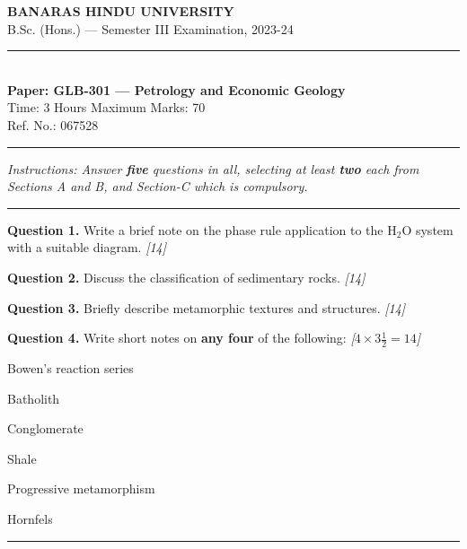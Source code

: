\documentclass[11pt,a4paper]{article}
\newcommand{\pts}[1]{\hfill   \textit{[#1]}}
\begin{document}
\begin{center}
  {\large\bfseries BANARAS HINDU UNIVERSITY}\\[2pt]
  {\normalsize B.Sc. (Hons.) --- Semester III Examination, 2023-24}\\[6pt]
  \rule{0.8\linewidth}{0.5pt}\\[6pt]
  {\large\bfseries Paper: GLB-301 --- Petrology and Economic Geology}\\[4pt]
  {\normalsize Time: 3 Hours \hfill Maximum Marks: 70}\\[2pt]
  {\small Ref. No.: 067528}
\end{center}
\rule{\linewidth}{0.4pt}
\smallskip



\noindent   \textit{Instructions: Answer   \textbf{five} questions in all, selecting at least   \textbf{two} each from Sections A and B, and Section-C which is compulsory.}
\bigskip

\bigskip


\rule{\linewidth}{0.4pt}\smallskip




\noindent   \textbf{Question 1.} Write a brief note on the phase rule application to the $ \text{H}_2 \text{O}$ system with a suitable diagram. \pts{14}

\medskip


\noindent   \textbf{Question 2.} Discuss the classification of sedimentary rocks. \pts{14}

\medskip


\noindent   \textbf{Question 3.} Briefly describe metamorphic textures and structures. \pts{14}

\medskip


\noindent   \textbf{Question 4.} Write short notes on   \textbf{any four} of the following: \pts{$4  \times 3\frac{1}{2} = 14$}

\begin{parts}
  \item Bowen's reaction series
  \item Batholith
  \item Conglomerate
  \item Shale
  \item Progressive metamorphism
  \item Hornfels
\end{parts}

\bigskip


\rule{\linewidth}{0.4pt}\smallskip
\end{document}
